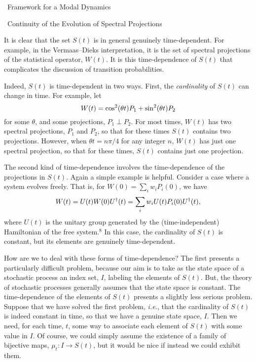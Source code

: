 \documentclass[12pt]{article}
\newcommand{\be}{\vspace*{6pt} \begin{equation}}
\newcommand{\ee}{\vspace*{10pt} \end{equation}}
\renewcommand{\section}[1]{\addtocounter{section}{1}
                           \setcounter{subsection}{0}
                           \setcounter{subsubsection}{0}
                           \vspace{20pt}
                           \begin{center}
                           {\large \thesection \ #1}
                           \end{center}
                           \vspace{20pt}}
\renewcommand{\subsection}[1]{\addtocounter{subsection}{1}
                           \setcounter{subsubsection}{0}
                           \vspace{20pt}
                           \begin{center}
                           \thesubsection \ #1
                           \end{center}
                           \vspace{20pt}}
\newcommand{\ie}{{\it i.e.}}         %
\begin{document}
\section{Framework for a Modal Dynamics}

\vspace{-30pt}

\subsection{Continuity of the Evolution of Spectral Projections}


It is clear that the set $S(t)$ is in general genuinely
time-dependent.  For example, in the Vermaas--Dieks interpretation, it
is the set of spectral projections of the statistical operator,
$W(t)$.  It is this time-dependence of $S(t)$ that complicates the
discussion of transition probabilities.

Indeed, $S(t)$ is time-dependent in two ways.  First, the {\it
cardinality} of $S(t)$ can change in time. For example, let
\be
\label{eq:easyexample}
W(t) = \cos^{2}(\theta t) P_{1} + \sin^{2}(\theta t) P_{2}
\ee
\noindent for some $\theta$, and some projections, $P_{1} \perp P_{2}$.
For most times, $W(t)$ has two spectral projections, $P_{1}$ and $P_{2}$,
so that for these times $S(t)$ contains two projections.  However,
when $\theta t = n\pi/4$ for any integer $n$, $W(t)$ has just one
spectral projection, so that for these times, $S(t)$ contains just one
projection.

The second kind of time-dependence involves the time-dependence of the
projections in $S(t)$.  Again a simple example is helpful.  Consider a
case where a system evolves freely.  That is, for $W(0) = \sum_i w_i P_i(0)$, 
we have
\be
W(t) = U(t) W(0) U^{\dagger}(t) = \sum_i w_i U(t) P_i(0) U^{\dagger}(t),
\ee
where $U(t)$ is the unitary group generated by the (time-independent)
Hamiltonian of the free system.$^8$ In this case, the cardinality of $S(t)$ 
is constant, but its elements are genuinely time-dependent.

How are we to deal with these forms of time-dependence?  The first
presents a particularly difficult problem, because our aim is to take
as the state space of a stochastic process an index set, $I$, labeling
the elements of $S(t)$.  But, the theory of stochastic processes
generally assumes that the state space is constant.  The
time-dependence of the elements of $S(t)$ presents a slightly less
serious problem.  Suppose that we have solved the first problem, \ie,
that the cardinality of $S(t)$ is indeed constant in time, so that we
have a genuine state space, $I$.  Then we need, for each time, $t$,
some way to associate each element of $S(t)$ with some value in $I$.
Of course, we could simply assume the existence of a family of
bijective maps, $\mu_{t}:I \rightarrow S(t)$, but it would be nice if
instead we could exhibit them.
\end{document}
